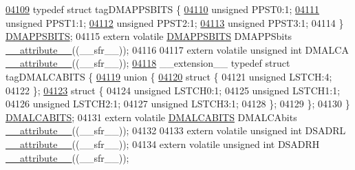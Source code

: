 \begin{DoxyCode}
\hypertarget{a00009_source_l04109}{}\hyperlink{a00008}{04109} \textcolor{keyword}{typedef} \textcolor{keyword}{struct }tagDMAPPSBITS \{
\hypertarget{a00009_source_l04110}{}\hyperlink{a00008_aae299822b7620c92a3d75906f76cee52}{04110}   \textcolor{keywordtype}{unsigned} PPST0:1;
\hypertarget{a00009_source_l04111}{}\hyperlink{a00008_a3716b700ebd3440adc899278d9b7625a}{04111}   \textcolor{keywordtype}{unsigned} PPST1:1;
\hypertarget{a00009_source_l04112}{}\hyperlink{a00008_acb64350921b2fac92cc1e8672db8b2a4}{04112}   \textcolor{keywordtype}{unsigned} PPST2:1;
\hypertarget{a00009_source_l04113}{}\hyperlink{a00008_a9db7f0ca39555bf6f18d7cd2029ff91d}{04113}   \textcolor{keywordtype}{unsigned} PPST3:1;
04114 \} \hyperlink{a00008_d4/d53/a00429}{DMAPPSBITS};
04115 \textcolor{keyword}{extern} \textcolor{keyword}{volatile} \hyperlink{a00008_d4/d53/a00429}{DMAPPSBITS} DMAPPSbits \hyperlink{a00009_a493c46f03454991ccc5aa7a6e1dfb2a7}{\_\_attribute\_\_}((\_\_sfr\_\_));
04116 
04117 \textcolor{keyword}{extern} \textcolor{keyword}{volatile} \textcolor{keywordtype}{unsigned} \textcolor{keywordtype}{int}  DMALCA \hyperlink{a00009_a493c46f03454991ccc5aa7a6e1dfb2a7}{\_\_attribute\_\_}((\_\_sfr\_\_));
\hypertarget{a00009_source_l04118}{}\hyperlink{a00008}{04118} \_\_extension\_\_ \textcolor{keyword}{typedef} \textcolor{keyword}{struct }tagDMALCABITS \{
\hypertarget{a00009_source_l04119}{}\hyperlink{a00009}{04119}   \textcolor{keyword}{union }\{
\hypertarget{a00009_source_l04120}{}\hyperlink{a00009}{04120}     \textcolor{keyword}{struct }\{
04121       \textcolor{keywordtype}{unsigned} LSTCH:4;
04122     \};
\hypertarget{a00009_source_l04123}{}\hyperlink{a00009}{04123}     \textcolor{keyword}{struct }\{
04124       \textcolor{keywordtype}{unsigned} LSTCH0:1;
04125       \textcolor{keywordtype}{unsigned} LSTCH1:1;
04126       \textcolor{keywordtype}{unsigned} LSTCH2:1;
04127       \textcolor{keywordtype}{unsigned} LSTCH3:1;
04128     \};
04129   \};
04130 \} \hyperlink{a00008_d7/db9/a00426}{DMALCABITS};
04131 \textcolor{keyword}{extern} \textcolor{keyword}{volatile} \hyperlink{a00008_d7/db9/a00426}{DMALCABITS} DMALCAbits \hyperlink{a00009_a493c46f03454991ccc5aa7a6e1dfb2a7}{\_\_attribute\_\_}((\_\_sfr\_\_));
04132 
04133 \textcolor{keyword}{extern} \textcolor{keyword}{volatile} \textcolor{keywordtype}{unsigned} \textcolor{keywordtype}{int}  DSADRL \hyperlink{a00009_a493c46f03454991ccc5aa7a6e1dfb2a7}{\_\_attribute\_\_}((\_\_sfr\_\_));
04134 \textcolor{keyword}{extern} \textcolor{keyword}{volatile} \textcolor{keywordtype}{unsigned} \textcolor{keywordtype}{int}  DSADRH \hyperlink{a00009_a493c46f03454991ccc5aa7a6e1dfb2a7}{\_\_attribute\_\_}((\_\_sfr\_\_));

\end{DoxyCode}
